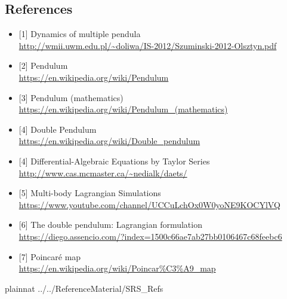 \documentclass[12pt]{article}
\begin{document}
\subsection*{References}\label{ssec:ref}
\begin{itemize}
\item{[1]} Dynamics of multiple pendula \\\url{http://wmii.uwm.edu.pl/~doliwa/IS-2012/Szuminski-2012-Olsztyn.pdf}
\item{[2]} Pendulum \\\url{https://en.wikipedia.org/wiki/Pendulum}
\item{[3]} Pendulum (mathematics)
\\\url{https://en.wikipedia.org/wiki/Pendulum_(mathematics)}
\item{[4]} Double Pendulum
\\\url{https://en.wikipedia.org/wiki/Double_pendulum}\item{[4]}
Differential-Algebraic Equations by Taylor Series
\\\url{http://www.cas.mcmaster.ca/~nedialk/daets/}
\item{[5]} Multi-body Lagrangian Simulations
\\\url{https://www.youtube.com/channel/UCCuLchOx0W0yoNE9KOCYlVQ}
\item{[6]} The double pendulum: Lagrangian formulation
\\\url{https://diego.assencio.com/?index=1500c66ae7ab27bb0106467c68feebc6}
\item{[7]} Poincaré map
\\\url{https://en.wikipedia.org/wiki/Poincar%C3%A9_map}
\end{itemize}

 {plainnat}
 {../../ReferenceMaterial/SRS_Refs}
\end{document}

